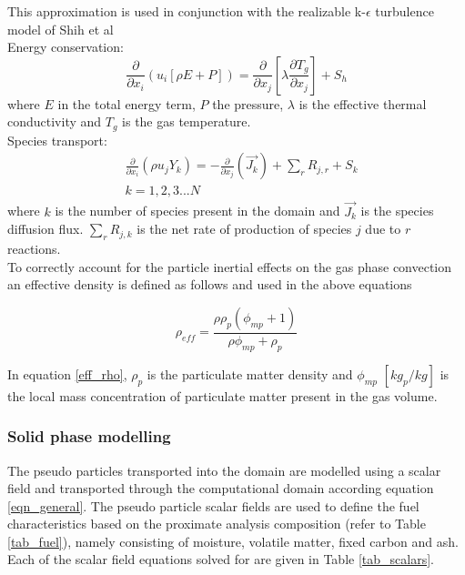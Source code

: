 \documentclass{webofc}
\begin{document}
This approximation is used in conjunction with the realizable k-$\epsilon$ turbulence model of Shih et al \cite{shih}\\

Energy conservation:
\begin{equation}\label{eqn_energy}
\frac{\partial }{\partial x_{i}} (u_{i}[\rho E+P])=\frac{\partial }{\partial x_{j}}\left[\lambda\frac{\partial T_{g}}{\partial x_{j}}\right] +S_{h}
\end{equation}
where $E$ in the total energy term, $P$ the pressure, $\lambda$ is the effective thermal conductivity and $T_g$ is the gas temperature.\\

Species transport:
\begin{equation}\label{eqn_species}
\begin{split}
&\frac{\partial}{\partial x_{i}}(\rho u_{j}Y_{k})=-\frac{\partial}{\partial x_{j}}(\vec{J_{k}})+ \sum_r R_{j,r} + S_{k}\\
&k = 1,2,3...N
\end{split}
\end{equation}
where $k$ is the number of species present in the domain and $\vec{J_{k}}$ is the species diffusion flux. $\sum_r R_{j,k}$ is the net rate of production of species $j$ due to $r$ reactions.\\

To correctly account for the particle inertial effects on the gas phase convection an effective density is defined as follows and used in the above equations

\begin{equation} \label{eff_rho}
	\rho_{eff} = \frac{\rho \rho_p \left( \phi_{mp} + 1 \right)}{\rho \phi_{mp} + \rho_p}
\end{equation}

In equation \eqref{eff_rho}, $\rho_p$ is the particulate matter density and $\phi_{mp}$ $[kg_p/kg]$ is the local mass concentration of particulate matter present in the gas volume. 

\subsubsection{Solid phase modelling}
The pseudo particles transported into the domain are modelled using a scalar field and transported through the computational domain according equation \ref{eqn_general}. The pseudo particle scalar fields are used to define the fuel characteristics based on the proximate analysis composition (refer to Table \ref{tab_fuel}), namely consisting of moisture, volatile matter, fixed  carbon and ash. Each of the scalar field equations solved for are given in Table \ref{tab_scalars}.\\
\end{document}
